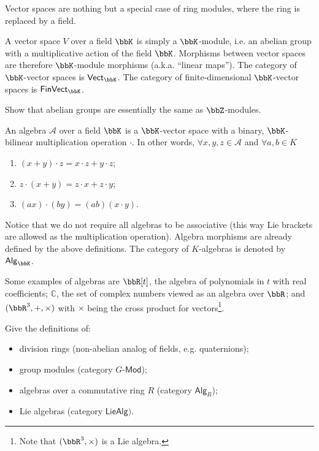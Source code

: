 Vector spaces are nothing but a special case of ring modules, where
the ring is replaced by a field.
\begin{defn}
    A vector space $V$ over a field $\bbK$ is simply a $\bbK$-module, i.e.
    an abelian group with a multiplicative action of the field $\bbK$. Morphisms
    between vector spaces are therefore $\bbK$-module morphisms (a.k.a.
    ``linear maps''). The category of $\bbK$-vector spaces is $\mathsf{Vect}_{\bbK}$.
    The category of finite-dimensional $\bbK$-vector spaces is $\mathsf{FinVect}_{\bbK}$.
\end{defn}
\begin{xca}
    Show that abelian groups are essentially the same as $\bbZ$-modules.
\end{xca}
\begin{defn}
    An algebra $\mathcal{A}$ over a field $\bbK$ is a $\bbK$-vector space
    with a binary, $\bbK$-bilinear multiplication operation $\cdot$. In
    other words, $\forall x,y,z\in\mathcal{A}$ and $\forall a,b\in K$ 
    \begin{enumerate}
        \item $(x+y)\cdot z=x\cdot z+y\cdot z$;
        \item $z\cdot(x+y)=z\cdot x+z\cdot y$;
        \item $(ax)\cdot(by)=(ab)(x\cdot y)$.
    \end{enumerate}
\end{defn}
Notice that we do not require all algebras to be associative (this
way Lie brackets are allowed as the multiplication operation). Algebra
morphisms are already defined by the above definitions. The category
of $K$-algebras is denoted by $\mathsf{Alg}_{\bbK}$.
\begin{example}
    Some examples of algebras are $\bbR [t]$, the algebra of polynomials
    in $t$ with real coefficients; $\mathbb{C}$, the set of complex
    numbers viewed as an algebra over $\bbR $; and $(\bbR^{3},+,\times)$
    with $\times$ being the cross product for vectors\footnote{Note that $(\bbR^{3},\times)$ is a Lie algebra.}.
\end{example}
\begin{xca}
    Give the definitions of:
    \begin{itemize}
        \item division rings (non-abelian analog of fields, e.g. quaternions);
        \item group modules (category $G\text{-}\mathsf{Mod}$);
        \item algebras over a commutative ring $R$ (category $\mathsf{Alg}_{R}$);
        \item Lie algebras (category $\mathsf{LieAlg})$.
    \end{itemize}
\end{xca}

